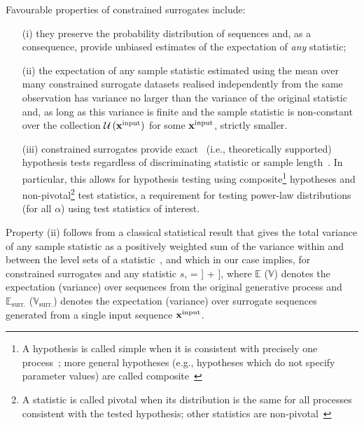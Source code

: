 \documentclass[%
prx,
reprint,
superscriptaddress,
nofootinbib,
 amsmath,amssymb,
 aps,
floatfix,
]{revtex4-2}
\let\oldequation\equation
\let\oldendequation\endequation
\renewenvironment{equation}{%
    \linenomathNonumbers\oldequation
    }{%
    \oldendequation\endlinenomath%
    }
\newcommand{\xin}{{{\bf x}^{\text{input}}}}
\begin{document}
Favourable properties of constrained surrogates include: 
\begin{itemize}
\item [(i)] they preserve the probability distribution of sequences and, as a consequence,  provide unbiased estimates of the expectation of \emph{any} statistic;

\item[(ii)] the expectation of any sample statistic estimated using the mean over many constrained surrogate datasets realised independently from the same observation has variance no larger than the variance of the original statistic and, as long as this variance is finite and the sample statistic is non-constant over the collection $\mathcal{U}\left({\xin}\right)$ for some $\xin$, strictly smaller.

\item[(iii)] constrained surrogates provide exact~\cite{theiler1997using,besag2013exact,pethel2014exact} (i.e., theoretically supported) hypothesis tests regardless of discriminating statistic or sample length~\cite{theiler1996constrained}. In particular, this allows for hypothesis testing using composite\footnote{A hypothesis is called simple when it is consistent with precisely one process~\cite{theiler1996constrained,small1998correlation,small2005applied,paluvs2007nonlinearity}; more general hypotheses (e.g., hypotheses which do not specify parameter values) are called composite~\cite{theiler1996constrained,small1998correlation,van1998testing,schreiber1999interdisciplinary,schreiber2000surrogate,small2005applied,paluvs2007nonlinearity}} hypotheses and non-pivotal\footnote{A statistic is called pivotal when its distribution is the same for all processes consistent with the tested hypothesis; other statistics are non-pivotal~\cite{theiler1996constrained,small1998correlation,small2005applied,paluvs2007nonlinearity}} test statistics, a requirement for testing power-law distributions (for all $\alpha$) using test statistics of interest.
\end{itemize}
Property (ii) follows from a classical statistical result that gives the total variance of any sample statistic as a positively weighted sum of the variance within and between the level sets of a statistic~\cite{fisher1938statistical}, and which in our case implies, for constrained surrogates and any statistic $s$,
\begin{equation}\label{eq.var}
 \left[ s\right] =  \left[\mathbb{E}_{\textrm{surr.}} \left[ s\right] \right] +  \left[\mathbb{V}_{\textrm{surr.}} \left[ s\right] \right],
\end{equation}
where $\mathbb{E}$ ($\mathbb{V}$) denotes the expectation (variance) over sequences from the original generative process and $\mathbb{E}_{\textrm{surr.}}$ ($\mathbb{V}_{\textrm{surr.}}$) denotes the expectation (variance) over surrogate sequences generated from a single input sequence $\xin$.
\end{document}

